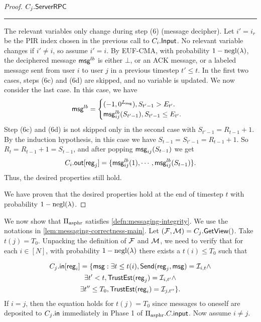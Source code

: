 \begin{proof}
\vspace{10pt}
$C_j.\mathsf{ServerRPC}$
\hrule
The relevant variables only change during step (6) (message decipher). Let $i' = i_r$ be the PIR index chosen in the previous call to $C_i.\mathsf{Input}$. No relevant variable changes if $i' \neq i$, so assume $i' = i$. By EUF-CMA, with probability $1 - \operatorname{negl}(\lambda)$, the deciphered message $\mathsf{msg}^{lb}$ is either $\bot$, or an ACK message, or a labeled message sent from user $i$ to user $j$ in a previous timestep $t' \leq t$.  In the first two cases, steps (6c) and (6d) are skipped, and no variable is updated. We now consider the last case. In this case, we have
$$\mathsf{msg}^{lb} = \begin{cases}
(-1, 0^{L_{\mathsf{msg}}}), S_{t' - 1} > E_{t'}. \\
\mathsf{msg}_{ij}^{lb}(S_{t' - 1}), S_{t' - 1} \leq E_{t'}. 
\end{cases}$$
Step (6c) and (6d) is not skipped only in the second case with $S_{t' - 1} = R_{t - 1} + 1$. By the induction hypothesis, in  this case we have $S_{t - 1} = S_{t' - 1} = R_{t - 1} + 1$. So $R_t = R_{t - 1} + 1 = S_{t - 1}$, and after popping $\mathsf{msg}_{ij}(S_{t - 1})$ we get
$$C_i.\mathsf{out}[\mathsf{reg}_j] = \{\mathsf{msg}^{lb}_{ij}(1), \cdots, \mathsf{msg}^{lb}_{ij}(S_{t - 1})\}.$$
Thus, the desired properties still hold.

We have proven that the desired properties hold at the end of timestep $t$ with probability $1 - \operatorname{negl}(\lambda)$.
\end{proof}
We now show that $\Pi_{\text{asphr}}$ satisfies \cref{defn:messaging-integrity}. We use the notations in \cref{lem:messaging-correctness-main}. Let $(\mathcal{F}, \mathcal{M}) = C_j.\mathsf{GetView}()$. Take $t(j) = T_0$. Unpacking the definition of $\mathcal{F}$ and $\mathcal{M}$, we need to verify that for each $i \in [N]$, with probability $1 - \operatorname{negl}(\lambda)$ there exists a $t(i) \leq T_0$ such that
 
 \begin{multline*}
 C_j.\mathsf{in}[\mathsf{reg}_i] = \{\mathsf{msg}: \exists t \leq t(i), \mathsf{Send}(\mathsf{reg}_j, \mathsf{msg}) = \mathcal{I}_{i, t} \land \\
 \exists t' < t, \mathsf{TrustEst}(\mathsf{reg}_j) = \mathcal{I}_{i, t'} \land \\
 \exists t'' \leq T_0, \mathsf{TrustEst}(\mathsf{reg}_i) = \mathcal{I}_{j, t''}\}.   
 \end{multline*} 
  If $i = j$, then the equation holds for $t(j) = T_0$ since messages to oneself are deposited to $C_j.\mathsf{in}$ immediately in Phase 1 of $\Pi_{\text{asphr}}.C.\mathsf{input}$. Now assume $i \neq j.$ 
 

